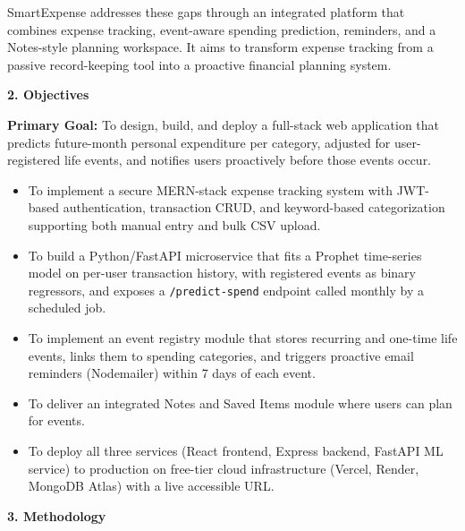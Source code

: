 \documentclass[12pt,a4paper]{article}\ref{}
\newcommand{\sectiontitle}[1]{%
    \vspace{8pt}
    \textbf{\large #1}
    \vspace{4pt}
}
\begin{document}
SmartExpense addresses these gaps through an integrated platform that combines
expense tracking, event-aware spending prediction, reminders, and a Notes-style
planning workspace. It aims to transform expense tracking from a passive
record-keeping tool into a proactive financial planning system.


\sectiontitle{2. Objectives}

\textbf{Primary Goal:} To design, build, and deploy a full-stack web application that predicts
future-month personal expenditure per category, adjusted for user-registered life
events, and notifies users proactively before those events occur.

\begin{itemize}[leftmargin=1.5em]
    \item To implement a secure MERN-stack expense tracking system with JWT-based
    authentication, transaction CRUD, and keyword-based categorization supporting
    both manual entry and bulk CSV upload.

    \item To build a Python/FastAPI microservice that fits a Prophet time-series model
    on per-user transaction history, with registered events as binary regressors, and
    exposes a \texttt{/predict-spend} endpoint called monthly by a scheduled job.

    \item To implement an event registry module that stores recurring and one-time life
    events, links them to spending categories, and triggers proactive email reminders
    (Nodemailer) within 7 days of each event.

    \item To deliver an integrated Notes and Saved Items module where users can plan
    for events.

    \item To deploy all three services (React frontend, Express backend, FastAPI ML
    service) to production on free-tier cloud infrastructure (Vercel, Render,
    MongoDB Atlas) with a live accessible URL.
\end{itemize}


\sectiontitle{3. Methodology}
\end{document}
